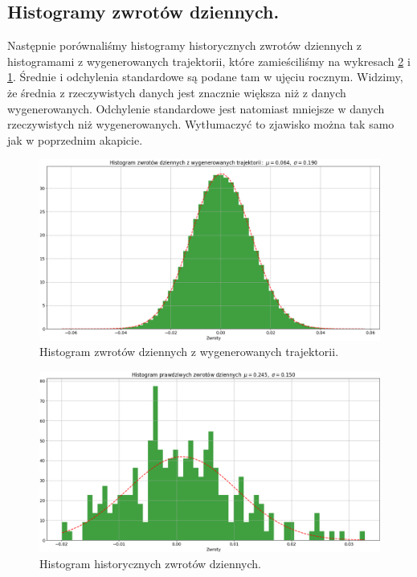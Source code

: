 \documentclass[12pt]{article}
\begin{document}
\subsection{Histogramy zwrotów dziennych.}
Następnie porównaliśmy histogramy historycznych zwrotów dziennych z histogramami z wygenerowanych trajektorii, które zamieściliśmy na wykresach \ref{fig:hist_wig20_true} i \ref{fig:hist_wig20_pred}. Średnie i odchylenia standardowe są podane tam w ujęciu rocznym. Widzimy, że średnia z rzeczywistych danych jest znacznie większa niż z danych wygenerowanych. Odchylenie standardowe jest natomiast mniejsze w danych rzeczywistych niż wygenerowanych. Wytłumaczyć to zjawisko można tak samo jak w poprzednim akapicie. 

\begin{figure}[H]
    \centering
    \includegraphics[width=\textwidth,height=\textheight,keepaspectratio]{hist_wig20_predykcje.png}
    \caption{Histogram zwrotów dziennych z wygenerowanych trajektorii.}
    \label{fig:hist_wig20_pred}
\end{figure}

\begin{figure}[H]
    \centering
    \includegraphics[width=\textwidth,height=\textheight,keepaspectratio]{hist_wig20_prawdziwe.png}
    \caption{Histogram historycznych zwrotów dziennych.}
    \label{fig:hist_wig20_true}
\end{figure}
\end{document}
